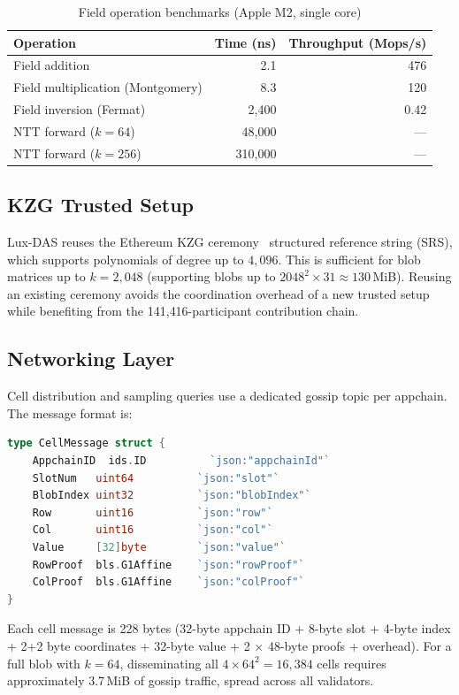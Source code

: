 \begin{table}[H]
\centering
\caption{Field operation benchmarks (Apple M2, single core)}
\label{tab:field-ops}
\begin{tabular}{lrr}
\toprule
\textbf{Operation} & \textbf{Time (ns)} & \textbf{Throughput (Mops/s)} \\
\midrule
Field addition & 2.1 & 476 \\
Field multiplication (Montgomery) & 8.3 & 120 \\
Field inversion (Fermat) & 2{,}400 & 0.42 \\
NTT forward ($k=64$) & 48{,}000 & --- \\
NTT forward ($k=256$) & 310{,}000 & --- \\
\bottomrule
\end{tabular}
\end{table}

\subsection{KZG Trusted Setup}

Lux-DAS reuses the Ethereum KZG ceremony~\cite{ethereumceremony} structured reference string
(SRS), which supports polynomials of degree up to $4{,}096$. This is sufficient for blob
matrices up to $k = 2{,}048$ (supporting blobs up to $2048^2 \times 31 \approx 130$\,MiB).
Reusing an existing ceremony avoids the coordination overhead of a new trusted setup while
benefiting from the 141{,}416-participant contribution chain.

\subsection{Networking Layer}

Cell distribution and sampling queries use a dedicated gossip topic per appchain. The message
format is:

\begin{lstlisting}[language=Go, caption={Cell gossip message}]
type CellMessage struct {
    AppchainID  ids.ID          `json:"appchainId"`
    SlotNum   uint64          `json:"slot"`
    BlobIndex uint32          `json:"blobIndex"`
    Row       uint16          `json:"row"`
    Col       uint16          `json:"col"`
    Value     [32]byte        `json:"value"`
    RowProof  bls.G1Affine    `json:"rowProof"`
    ColProof  bls.G1Affine    `json:"colProof"`
}
\end{lstlisting}

Each cell message is 228 bytes (32-byte appchain ID + 8-byte slot + 4-byte index + 2+2 byte
coordinates + 32-byte value + 2 $\times$ 48-byte proofs + overhead). For a full blob with
$k=64$, disseminating all $4 \times 64^2 = 16{,}384$ cells requires approximately 3.7\,MiB
of gossip traffic, spread across all validators.

